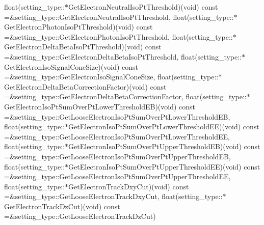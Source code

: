 \begin{DoxyCompactItemize}
float(setting\_\-type::$\ast$GetElectronNeutralIsoPtThreshold)(void) const =\&setting\_\-type::GetElectronNeutralIsoPtThreshold, float(setting\_\-type::$\ast$GetElectronPhotonIsoPtThreshold)(void) const =\&setting\_\-type::GetElectronPhotonIsoPtThreshold, float(setting\_\-type::$\ast$GetElectronDeltaBetaIsoPtThreshold)(void) const =\&setting\_\-type::GetElectronDeltaBetaIsoPtThreshold, float(setting\_\-type::$\ast$GetElectronIsoSignalConeSize)(void) const =\&setting\_\-type::GetElectronIsoSignalConeSize, float(setting\_\-type::$\ast$GetElectronDeltaBetaCorrectionFactor)(void) const =\&setting\_\-type::GetElectronDeltaBetaCorrectionFactor, float(setting\_\-type::$\ast$GetElectronIsoPtSumOverPtLowerThresholdEB)(void) const =\&setting\_\-type::GetLooseElectronIsoPtSumOverPtLowerThresholdEB, float(setting\_\-type::$\ast$GetElectronIsoPtSumOverPtLowerThresholdEE)(void) const =\&setting\_\-type::GetLooseElectronIsoPtSumOverPtLowerThresholdEE, float(setting\_\-type::$\ast$GetElectronIsoPtSumOverPtUpperThresholdEB)(void) const =\&setting\_\-type::GetLooseElectronIsoPtSumOverPtUpperThresholdEB, float(setting\_\-type::$\ast$GetElectronIsoPtSumOverPtUpperThresholdEE)(void) const =\&setting\_\-type::GetLooseElectronIsoPtSumOverPtUpperThresholdEE, float(setting\_\-type::$\ast$GetElectronTrackDxyCut)(void) const =\&setting\_\-type::GetLooseElectronTrackDxyCut, float(setting\_\-type::$\ast$GetElectronTrackDzCut)(void) const =\&setting\_\-type::GetLooseElectronTrackDzCut)
\end{DoxyCompactItemize}



